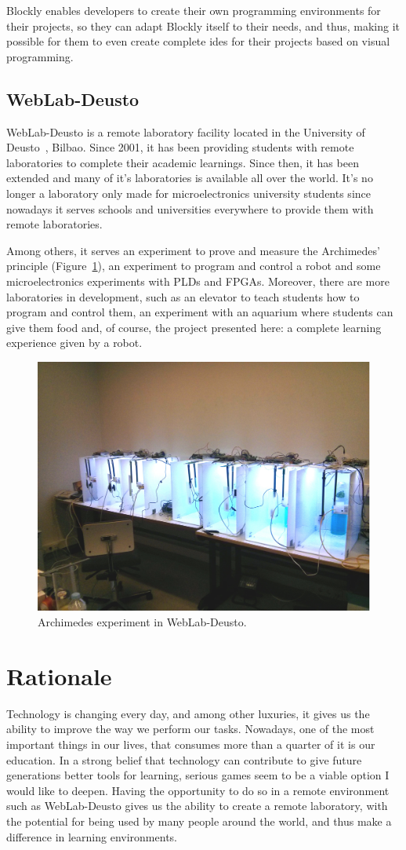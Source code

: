 Blockly enables developers to create their own programming environments for their projects, so they
can adapt Blockly itself to their needs, and thus, making it possible for them to even create
complete \acrshort{ide}s for their projects based on visual programming.

\subsection{WebLab-Deusto}

WebLab-Deusto is a remote laboratory facility located in the University of Deusto~\cite{weblab},
Bilbao. Since 2001, it has been providing students with remote laboratories to complete their
academic learnings. Since then, it has been extended and many of it's laboratories is available
all over the world. It's no longer a laboratory only made for microelectronics university students
since nowadays it serves schools and universities everywhere to provide them with remote
laboratories.

Among others, it serves an experiment to prove and measure the Archimedes' principle
(Figure~\ref{fig:archimedes}), an experiment to program and control a robot and some
microelectronics experiments with PLDs and FPGAs. Moreover, there are more laboratories in
development, such as an elevator to teach students how to program and control them, an experiment
with an aquarium where students can give them food and, of course, the project presented here: a
complete learning experience given by a robot.

\begin{figure}[!htbp]
	\centering
	\includegraphics[width=.4\textwidth]{fig/archimedes}
	\caption{Archimedes experiment in WebLab-Deusto.}\label{fig:archimedes}
\end{figure}

\section{Rationale}

Technology is changing every day, and among other luxuries, it gives us the ability to improve the
way we perform our tasks. Nowadays, one of the most important things in our lives, that consumes
more than a quarter of it is our education. In a strong belief that technology can contribute to
give future generations better tools for learning, serious games seem to be a viable option I would
like to deepen. Having the opportunity to do so in a remote environment such as WebLab-Deusto gives
us the ability to create a remote laboratory, with the potential for being used by many people
around the world, and thus make a difference in learning environments.
